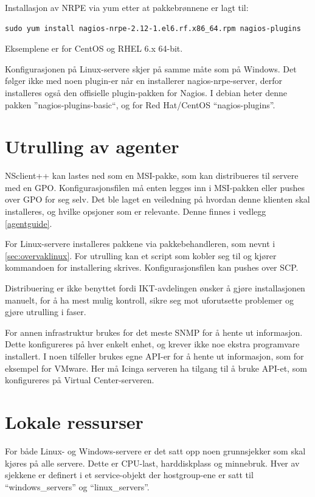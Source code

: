Installasjon av NRPE via yum etter at pakkebrønnene er lagt til:
\begin{lstlisting}[style=example]
sudo yum install nagios-nrpe-2.12-1.el6.rf.x86_64.rpm nagios-plugins
\end{lstlisting}

Eksemplene er for CentOS og RHEL 6.x 64-bit.

Konfigurasjonen på Linux-servere skjer på samme måte som på Windows. Det følger ikke med noen plugin-er når en installerer nagios-nrpe-server, derfor installeres også den offisielle plugin-pakken for Nagios. I debian heter denne pakken ''nagios-plugins-basic``, og for Red Hat/CentOS ``nagios-plugins''.

\section{Utrulling av agenter}
NSclient++ kan lastes ned som en MSI-pakke, som kan distribueres til servere med en GPO. Konfigurasjonsfilen må enten legges inn i MSI-pakken eller pushes over GPO for seg selv. Det ble laget en veiledning på hvordan denne klienten skal installeres, og hvilke opsjoner som er relevante. Denne finnes i vedlegg \ref{agentguide}.

For Linux-servere installeres pakkene via pakkebehandleren, som nevnt i \ref{sec:overvaklinux}. For utrulling kan et script som kobler seg til og kjører kommandoen for installering skrives. Konfigurasjonsfilen kan pushes over SCP.

Distribuering er ikke benyttet fordi IKT-avdelingen ønsker å gjøre installasjonen manuelt, for å ha mest mulig kontroll, sikre seg mot uforutsette problemer og gjøre utrulling i faser.
 
For annen infrastruktur brukes for det meste SNMP for å hente ut informasjon. Dette konfigureres på hver enkelt enhet, og krever ikke noe ekstra programvare installert. I noen tilfeller brukes egne API-er for å hente ut informasjon, som for eksempel for VMware. Her må Icinga serveren ha tilgang til å bruke API-et, som konfigureres på Virtual Center-serveren.

\section{Lokale ressurser}
For både Linux- og Windows-servere er det satt opp noen grunnsjekker som skal kjøres på alle servere. Dette er CPU-last, harddiskplass og minnebruk. Hver av sjekkene er definert i et service-objekt der hostgroup-ene er satt til ``windows\_servers'' og ``linux\_servers''. 

